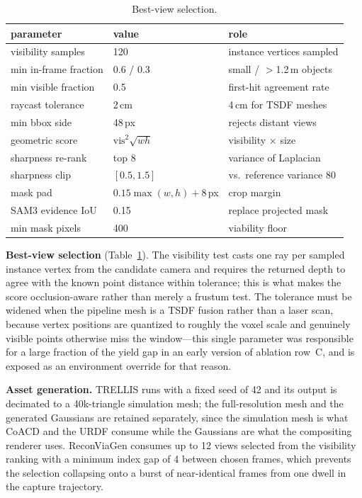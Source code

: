 \begin{table}[htbp]
\caption{Best-view selection.}
\label{tab:s-bestview}
\centering\footnotesize\setlength{\tabcolsep}{4pt}
\begin{tabular}{@{}p{26mm}p{20mm}p{28mm}@{}}
\toprule
parameter & value & role \\
\midrule
visibility samples & 120 & instance vertices sampled \\
min in-frame fraction & 0.6 / 0.3 & small / $>$1.2\,m objects \\
min visible fraction & 0.5 & first-hit agreement rate \\
raycast tolerance & 2\,cm & 4\,cm for TSDF meshes \\
min bbox side & 48\,px & rejects distant views \\
geometric score & $\mathrm{vis}^2\sqrt{wh}$ & visibility $\times$ size \\
sharpness re-rank & top 8 & variance of Laplacian \\
sharpness clip & $[0.5,1.5]$ & vs.\ reference variance 80 \\
mask pad & $0.15\max(w,h)+8$\,px & crop margin \\
SAM3 evidence IoU & 0.15 & replace projected mask \\
min mask pixels & 400 & viability floor \\
\bottomrule
\end{tabular}
\end{table}

\textbf{Best-view selection} (Table~\ref{tab:s-bestview}). The visibility
test casts one ray per sampled instance vertex from the candidate camera
and requires the returned depth to agree with the known point distance
within tolerance; this is what makes the score occlusion-aware rather
than merely a frustum test. The tolerance must be widened when the
pipeline mesh is a TSDF fusion rather than a laser scan, because vertex
positions are quantized to roughly the voxel scale and genuinely visible
points otherwise miss the window---this single parameter was responsible
for a large fraction of the yield gap in an early version of ablation
row~C, and is exposed as an environment override for that reason.

\textbf{Asset generation.} TRELLIS runs with a fixed seed of 42 and its
output is decimated to a 40k-triangle simulation mesh; the
full-resolution mesh and the generated Gaussians are retained separately,
since the simulation mesh is what CoACD and the URDF consume while the
Gaussians are what the compositing renderer uses. ReconViaGen consumes up
to 12 views selected from the visibility ranking with a minimum index gap
of 4 between chosen frames, which prevents the selection collapsing onto
a burst of near-identical frames from one dwell in the capture
trajectory.

